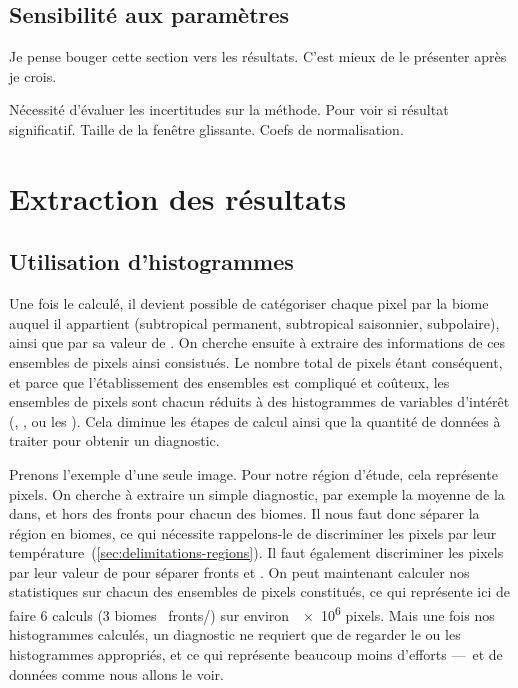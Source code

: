 \subsection{Sensibilité aux paramètres}
\label{sec:HI-sensibilite}

Je pense bouger cette section vers les résultats. C'est mieux de le présenter après je crois.

Nécessité d'évaluer les incertitudes sur la méthode.
Pour voir si résultat significatif.
Taille de la fenêtre glissante. Coefs de normalisation.


\section{Extraction des résultats}
\label{sec:extraction-res}

\subsection{Utilisation d'histogrammes}
\label{sec:extraction-hist}

Une fois le  calculé, il devient possible de catégoriser chaque pixel par la biome auquel il appartient (subtropical permanent, subtropical saisonnier, subpolaire), ainsi que par sa valeur de .
On cherche ensuite à extraire des informations de ces ensembles de pixels ainsi consistués.
Le nombre total de pixels étant conséquent, et parce que l'établissement des ensembles est compliqué et coûteux, les ensembles de pixels sont chacun réduits à des histogrammes de variables d'intérêt (, , ou les ).
Cela diminue les étapes de calcul ainsi que la quantité de données à traiter pour obtenir un diagnostic.

Prenons l'exemple d'une seule image. Pour notre région d'étude, cela représente~ pixels.
On cherche à extraire un simple diagnostic, par exemple la moyenne de la  dans, et hors des fronts pour chacun des biomes.
Il nous faut donc séparer la région en biomes, ce qui nécessite rappelons-le de discriminer les pixels par leur température~(\cref{sec:delimitations-regions}).
Il faut également discriminer les pixels par leur valeur de  pour séparer fronts et .
On peut maintenant calculer nos statistiques sur chacun des ensembles de pixels constitués, ce qui représente ici de faire 6 calculs (3 biomes \texttimes\ fronts/) sur environ~\num{e6} pixels.
Mais une fois nos histogrammes calculés, un diagnostic ne requiert que de regarder le ou les histogrammes appropriés, et ce qui représente beaucoup moins d'efforts ---~et de données comme nous allons le voir.

